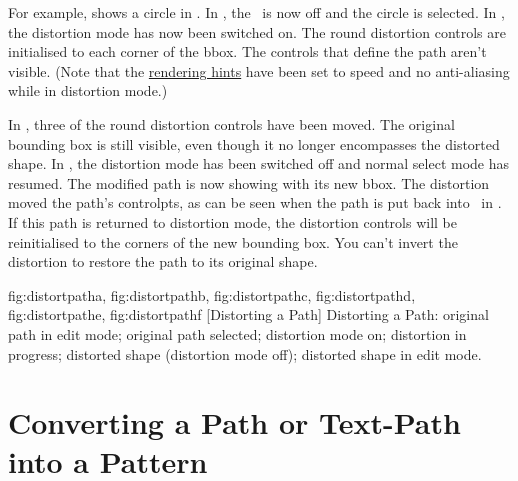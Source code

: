 For example,  shows a circle in 
\editpathmode. In , the \editpathmode\ is now off and
the circle is selected. In , the
distortion mode has now been switched on. The round distortion
controls are initialised to each corner of the \gls{bbox}. The
controls that define the path aren't visible. (Note that the
\hyperref[sec:graphics]{rendering hints} have been set to speed
and no anti-aliasing while in distortion mode.)

In , three of the round distortion
controls have been moved. The original bounding box is still
visible, even though it no longer encompasses the distorted shape.
In , the distortion mode has been
switched off and normal select mode has resumed. The modified path
is now showing with its new \gls{bbox}. The distortion moved the
path's \glspl{controlpt}, as can be seen when the path is put back into
\editpathmode\ in . If this path is
returned to distortion mode, the distortion controls will be reinitialised to
the corners of the new bounding box. You can't invert the distortion
to restore the path to its original shape.

{
  {fig:distortpatha}{}{},
  {fig:distortpathb}{}{},
  {fig:distortpathc}{}{},
  {fig:distortpathd}{}{},
  {fig:distortpathe}{}{},
  {fig:distortpathf}{}{}
}
[Distorting a Path]
{Distorting a Path: 
 original path in edit mode;
 original path selected;
 distortion mode on;
 distortion in progress;
 distorted shape (distortion mode off);
 distorted shape in edit mode.}

\section{Converting a Path or Text-Path into a Pattern}\label{sec:patterns}

